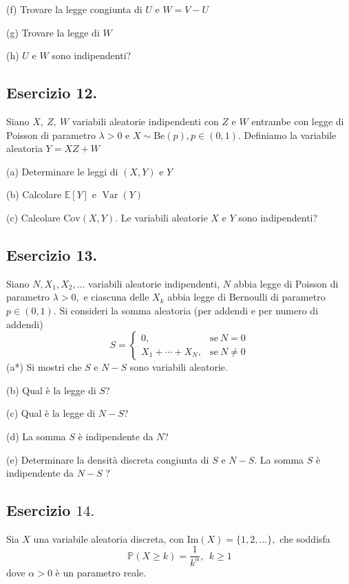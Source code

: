 (f) Trovare la legge congiunta di $U$ e $W=V-U$

(g) Trovare la legge di $W$

(h) $U$ e $W$ sono indipendenti?
\subsection{Esercizio 12.}

Siano $X,\ Z,\ W$ variabili aleatorie indipendenti con $Z$ e $W$ entrambe con legge di Poisson di parametro $\lambda  >0$ e $X\sim \mathrm{Be} (p),p\in (0,1)$. Definiamo la variabile aleatoria $Y=XZ+W$

(a) Determinare le leggi di $(X,Y)$ e $Y$

(b) Calcolare $\mathbb{E} [Y]$ e $\operatorname{Var} (Y)$

(c) Calcolare $\mathrm{Cov} (X,Y)$. Le variabili aleatorie $X$ e $Y$ sono indipendenti?
\subsection{Esercizio 13.}

Siano $N,X_{1} ,X_{2} ,\dotsc $ variabili aleatorie indipendenti, $N$ abbia legge di Poisson di parametro $\lambda  >0,$ e ciascuna delle $X_{k}$ abbia legge di Bernoulli di parametro $p\in (0,1).$ Si consideri la somma aleatoria (per addendi e per numero di addendi)
\begin{equation*}
S=\begin{cases}
0, & \text{se} \ N=0\\
X_{1} +\cdots +X_{N} , & \text{se} \ N\neq 0
\end{cases}
\end{equation*}
(a*) Si mostri che $S$ e $N-S$ sono variabili aleatorie.

(b) Qual è la legge di $S$?

(c) Qual è la legge di $N-S$?

(d) La somma $S$ è indipendente da $N$?

(e) Determinare la densità discreta congiunta di $S$ e $N-S$. La somma $S$ è indipendente da $N-S$ ?
\subsection{Esercizio $14.$}

Sia $X$ una variabile aleatoria discreta, con $\mathrm{Im} (X)=\{1,2,\dotsc \},$ che soddisfa
\begin{equation*}
\mathbb{P} (X\geq k)=\frac{1}{k^{\alpha }} ,\ \ k\geq 1
\end{equation*}
dove $\alpha  >0$ è un parametro reale.

